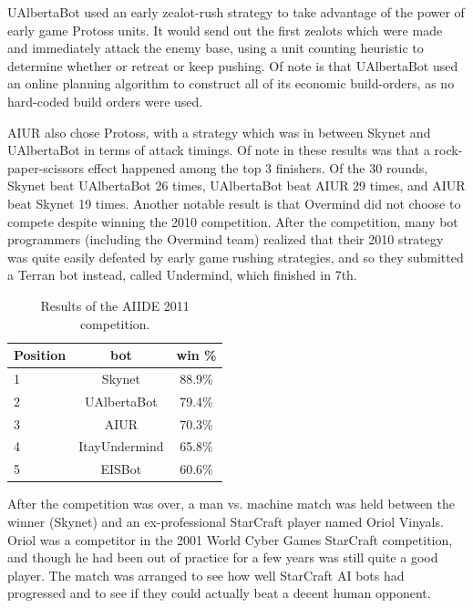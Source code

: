\documentclass[journal]{IEEEtran}
\begin{document}
UAlbertaBot used an early zealot-rush strategy to take advantage of the power of early game Protoss units. 
It would send out the first zealots which were made and immediately attack the enemy base, using a unit
counting heuristic to determine whether or retreat or keep pushing. Of note is that UAlbertaBot used an
online planning algorithm to construct all of its economic build-orders\cite{churchill2011build}, as no hard-coded build orders
were used. 

AIUR also chose Protoss, with a strategy which was in between Skynet and UAlbertaBot in terms of attack
timings. Of note in these results was that a rock-paper-scissors effect happened among the top 3 finishers.
Of the 30 rounds, Skynet beat UAlbertaBot 26 times, UAlbertaBot beat AIUR 29 times, and AIUR beat Skynet
19 times. Another notable result is that Overmind did not choose to compete despite winning the 2010
competition. After the competition, many bot programmers (including the Overmind team) realized that 
their 2010 strategy was quite easily defeated by early game rushing strategies, and so they submitted
a Terran bot instead, called Undermind, which finished in 7th.

\begin{table}[bth]
\caption{Results of the AIIDE 2011 competition.}
\label{tab:aiide2011}
\begin{small}
\begin{center}
\begin{tabular}{|l|c|c|}
\hline
Position & bot & win \% \\ \hline
1 & Skynet & 88.9\% \\
2 & UAlbertaBot & 79.4\% \\
3 & AIUR & 70.3\% \\
4 & ItayUndermind & 65.8\% \\
5 & EISBot & 60.6\% \\ \hline
\end{tabular}
\end{center}
\end{small}
\end{table}

After the competition was over, a man vs. machine match was held between the winner (Skynet) and an
ex-professional StarCraft player named Oriol Vinyals. Oriol was a competitor in the 2001 World Cyber
Games StarCraft competition, and though he had been out of practice for a few years was still quite a
good player. The match was arranged to see how well StarCraft AI bots had progressed and to see if
they could actually beat a decent human opponent. 
\end{document}
